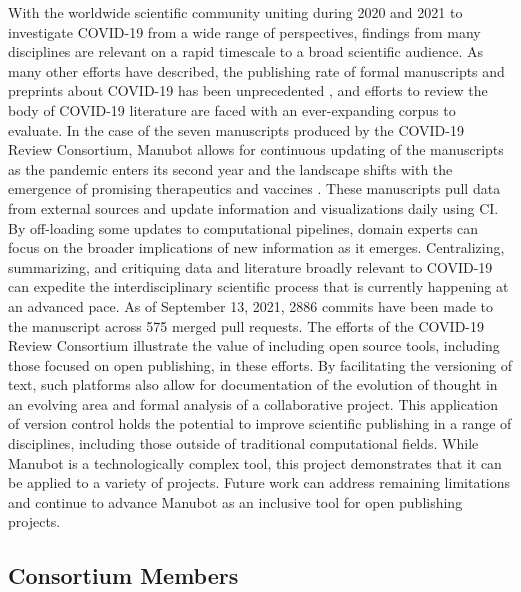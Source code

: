 \documentclass[twocolumn]{ceurart}
\begin{document}
With the worldwide scientific community uniting during 2020 and 2021 to investigate COVID-19 from a wide range of perspectives, findings from many disciplines are relevant on a rapid timescale to a broad scientific audience.
As many other efforts have described, the publishing rate of formal manuscripts and preprints about COVID-19 has been unprecedented \citep{7ub6VM4Z}, and efforts to review the body of COVID-19 literature are faced with an ever-expanding corpus to evaluate.
In the case of the seven manuscripts produced by the COVID-19 Review Consortium, Manubot allows for continuous updating of the manuscripts as the pandemic enters its second year and the landscape shifts with the emergence of promising therapeutics and vaccines \citep{njpLhBui}.
These manuscripts pull data from external sources and update information and visualizations daily using CI.
By off-loading some updates to computational pipelines, domain experts can focus on the broader implications of new information as it emerges.
Centralizing, summarizing, and critiquing data and literature broadly relevant to COVID-19 can expedite the interdisciplinary scientific process that is currently happening at an advanced pace.
As of September 13, 2021, 2886 commits have been made to the manuscript across 575 merged pull requests.
The efforts of the COVID-19 Review Consortium illustrate the value of including open source tools, including those focused on open publishing, in these efforts.
By facilitating the versioning of text, such platforms also allow for documentation of the evolution of thought in an evolving area and formal analysis of a collaborative project.
This application of version control holds the potential to improve scientific publishing in a range of disciplines, including those outside of traditional computational fields.
While Manubot is a technologically complex tool, this project demonstrates that it can be applied to a variety of projects.
Future work can address remaining limitations and continue to advance Manubot as an inclusive tool for open publishing projects.

\hypertarget{consortium-members}{%
\subsection*{Consortium Members}\label{consortium-members}}
\end{document}
